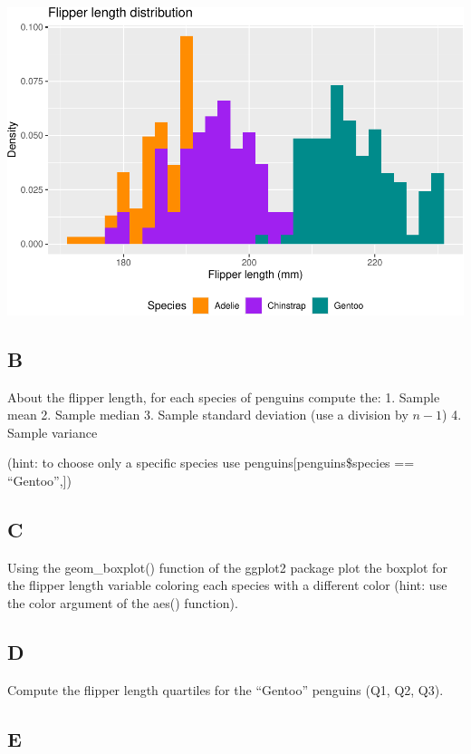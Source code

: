 \documentclass[
]{article}
\begin{document}
\includegraphics{es_files/figure-latex/unnamed-chunk-9-1.pdf}

\hypertarget{b-2}{%
\subsection{B}\label{b-2}}

About the flipper length, for each species of penguins compute the: 1.
Sample mean 2. Sample median 3. Sample standard deviation (use a
division by \(n-1\)) 4. Sample variance

(hint: to choose only a specific species use
penguins{[}penguins\$species == ``Gentoo'',{]})

\hypertarget{c-2}{%
\subsection{C}\label{c-2}}

Using the geom\_boxplot() function of the ggplot2 package plot the
boxplot for the flipper length variable coloring each species with a
different color (hint: use the color argument of the aes() function).

\hypertarget{d-2}{%
\subsection{D}\label{d-2}}

Compute the flipper length quartiles for the ``Gentoo'' penguins (Q1,
Q2, Q3).

\hypertarget{e-1}{%
\subsection{E}\label{e-1}}
\end{document}
